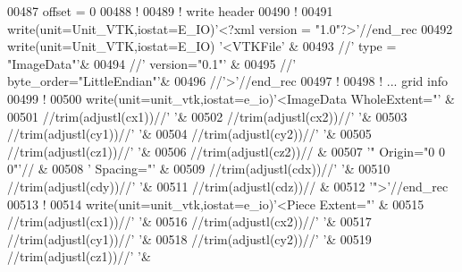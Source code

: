 \begin{DoxyCode}
00487 offset = 0
00488 \textcolor{comment}{!}
00489 \textcolor{comment}{! write header}
00490 \textcolor{comment}{!}
00491 \textcolor{keyword}{write}(unit=Unit\_VTK,iostat=E\_IO)\textcolor{stringliteral}{'<?xml version = "1.0"?>'}//end\_rec
00492 \textcolor{keyword}{write}(unit=Unit\_VTK,iostat=E\_IO)  \textcolor{stringliteral}{'<VTKFile'}                  &
00493                                 //\textcolor{stringliteral}{' type = "ImageData"'}&
00494                                 //\textcolor{stringliteral}{' version="0.1"'}            &
00495                                 //\textcolor{stringliteral}{' byte\_order="LittleEndian"'}&
00496                                 //\textcolor{stringliteral}{'>'}//end\_rec
00497 \textcolor{comment}{!}
00498 \textcolor{comment}{! ... grid info}
00499 \textcolor{comment}{!}
00500 \textcolor{keyword}{write}(unit=unit\_vtk,iostat=e\_io)\textcolor{stringliteral}{'<ImageData WholeExtent="'}  &
00501                                    //trim(adjustl(cx1))//\textcolor{stringliteral}{' '}&
00502                                    //trim(adjustl(cx2))//\textcolor{stringliteral}{' '}&
00503                                    //trim(adjustl(cy1))//\textcolor{stringliteral}{' '}&
00504                                    //trim(adjustl(cy2))//\textcolor{stringliteral}{' '}&
00505                                    //trim(adjustl(cz1))//\textcolor{stringliteral}{' '}&
00506                                    //trim(adjustl(cz2))//   &
00507                                    \textcolor{stringliteral}{'" Origin="0 0 0"'}//     &
00508                                    \textcolor{stringliteral}{' Spacing="'}             &
00509                                    //trim(adjustl(cdx))//\textcolor{stringliteral}{' '}&
00510                                    //trim(adjustl(cdy))//\textcolor{stringliteral}{' '}&
00511                                    //trim(adjustl(cdz))//   &
00512                                    \textcolor{stringliteral}{'">'}//end\_rec
00513 \textcolor{comment}{!}
00514 \textcolor{keyword}{write}(unit=unit\_vtk,iostat=e\_io)\textcolor{stringliteral}{'<Piece Extent="'}           &
00515                                    //trim(adjustl(cx1))//\textcolor{stringliteral}{' '}&
00516                                    //trim(adjustl(cx2))//\textcolor{stringliteral}{' '}&
00517                                    //trim(adjustl(cy1))//\textcolor{stringliteral}{' '}&
00518                                    //trim(adjustl(cy2))//\textcolor{stringliteral}{' '}&
00519                                    //trim(adjustl(cz1))//\textcolor{stringliteral}{' '}&

\end{DoxyCode}

